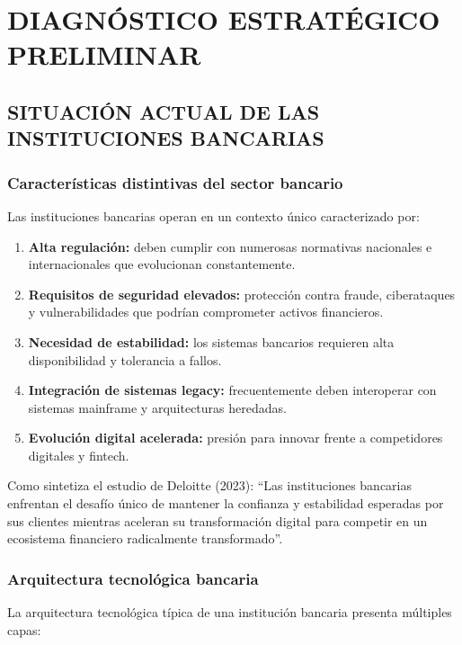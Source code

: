 \chapter{DIAGNÓSTICO ESTRATÉGICO PRELIMINAR}

\section{SITUACIÓN ACTUAL DE LAS INSTITUCIONES BANCARIAS}

\subsection{Características distintivas del sector bancario}


Las instituciones bancarias operan en un contexto único caracterizado por:

\begin{enumerate}
  \item \textbf{Alta regulación:} deben cumplir con numerosas normativas
        nacionales e internacionales que evolucionan constantemente.
  \item \textbf{Requisitos de seguridad elevados:} protección contra fraude,
        ciberataques y vulnerabilidades que podrían comprometer activos
        financieros.
  \item \textbf{Necesidad de estabilidad:} los sistemas bancarios requieren
        alta disponibilidad y tolerancia a fallos.
  \item \textbf{Integración de sistemas legacy:} frecuentemente deben
        interoperar con sistemas mainframe y arquitecturas heredadas.
  \item \textbf{Evolución digital acelerada:} presión para innovar frente a
        competidores digitales y fintech.
\end{enumerate}

Como sintetiza el estudio de Deloitte (2023): ``Las instituciones bancarias
enfrentan el desafío único de mantener la confianza y estabilidad esperadas
por sus clientes mientras aceleran su transformación digital para competir en
un ecosistema financiero radicalmente transformado''.


\subsection{Arquitectura tecnológica bancaria}


La arquitectura tecnológica típica de una institución bancaria presenta
múltiples capas:

